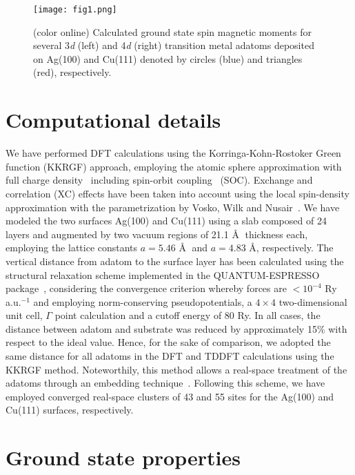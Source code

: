 \documentclass[prb,footinbib,showpacs,twocolumn,amsmath,amssymb]{revtex4}
\begin{document}
\begin{figure}[t]
\texttt{[image: fig1.png]}
\caption{(color online) Calculated ground state spin magnetic moments for several 3\textit{d} (left) and 4\textit{d} (right)
transition metal adatoms deposited on Ag(100)  and Cu(111) denoted by circles (blue) and
triangles (red), respectively.
}
\label{fig:M0}
\end{figure}



\section{Computational details}
\label{sec:compu}

We have performed DFT calculations using 
the Korringa-Kohn-Rostoker Green function (KKRGF) approach, employing  
the atomic sphere approximation 
with full charge density~\cite{papanikolaou_conceptual_2002}
including spin-orbit coupling~\cite{dias_relativistic_2015} (SOC). 
Exchange and correlation (XC) effects have been taken into account using the local 
spin-density approximation  with the parametrization by 
Vosko, Wilk and Nusair~\cite{vosko_accurate_1980}. 
We have modeled the two surfaces Ag(100) and Cu(111) 
using a slab composed of 24 layers and 
augmented by 
two vacuum regions of 21.1 \AA$\;$ thickness each, 
employing the lattice constants $a = 5.46$ \AA$\;$  and $a =4.83$ \AA, respectively.
The vertical distance from adatom to the surface layer has been 
calculated using the structural relaxation scheme
implemented in the QUANTUM-ESPRESSO package~\cite{espresso}, considering the 
convergence criterion whereby forces are $<10^{-4}$ Ry a.u.$^{-1}$ and employing
norm-conserving pseudopotentials, a $4\times4$ two-dimensional unit cell,
$\Gamma$ point calculation and a cutoff energy of 80 Ry.
In all cases, the distance between adatom and substrate was reduced
by approximately 15$\%$ with respect to the ideal value. Hence, for the sake of comparison, 
we adopted the same distance for all adatoms in the DFT and TDDFT calculations 
using the KKRGF method. 
Noteworthily, this method allows a real-space treatment of 
the adatoms through an embedding technique~\cite{papanikolaou_conceptual_2002}.
Following this scheme, we have employed converged real-space 
clusters of 43 and 55 sites for the Ag(100) and Cu(111) 
surfaces, respectively.



\section{Ground state properties}
\label{sec:GS}
\end{document}
